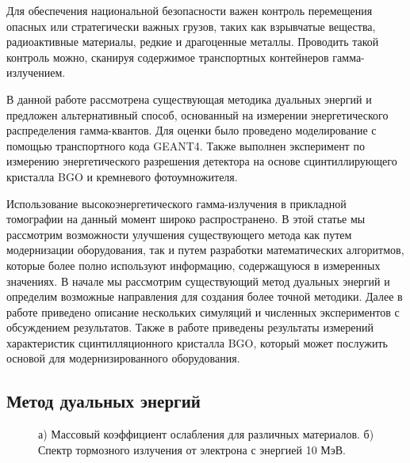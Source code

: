 Для обеспечения национальной безопасности важен контроль перемещения опасных или стратегически важных грузов, таких как взрывчатые вещества, радиоактивные материалы, редкие и драгоценные металлы. Проводить такой контроль можно, сканируя содержимое транспортных контейнеров гамма-излучением.

В данной работе рассмотрена существующая методика дуальных энергий и предложен альтернативный способ, основанный на измерении энергетического распределения гамма-квантов. Для оценки было проведено моделирование с помощью транспортного кода GEANT4.  Также выполнен эксперимент по измерению энергетического разрешения детектора на основе сцинтиллирующего кристалла BGO и кремневого фотоумножителя.

Использование высокоэнергетического гамма-излучения в прикладной томографии на данный момент широко распространено.  В этой статье мы рассмотрим возможности улучшения существующего метода как путем модернизации оборудования, так и путем разработки математических алгоритмов, которые более полно используют информацию, содержащуюся в измеренных значениях. В начале мы рассмотрим существующий метод дуальных энергий и определим возможные направления для создания более точной методики. Далее в работе приведено описание нескольких симуляций и численных экспериментов с обсуждением результатов. Также в работе приведены результаты измерений характеристик сцинтилляционного кристалла BGO, который может послужить основой для модернизированного оборудования.
 
\subsection{Метод дуальных энергий}
\begin{figure}[t]
    \begin{center}
        \begin{minipage}[h]{0.49\linewidth}
        \end{minipage}
        \hfill
        \begin{minipage}[h]{0.49\linewidth}
        \end{minipage}
        \caption{а) Массовый коэффициент ослабления для различных материалов. б) Спектр тормозного излучения от электрона с энергией 10 МэВ.}
    \end{center}
    \label{pic:att}
\end{figure}

